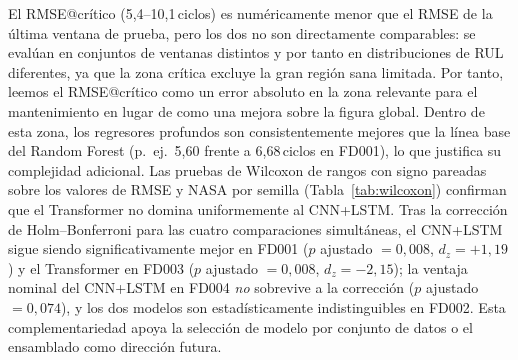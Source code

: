 \documentclass[5p,times,authoryear]{elsarticle}
\begin{document}
El RMSE@crítico (5{,}4--10{,}1\,ciclos) es numéricamente menor que el RMSE de la última ventana de prueba, pero los dos no son directamente comparables: se evalúan en conjuntos de ventanas distintos y por tanto en distribuciones de RUL diferentes, ya que la zona crítica excluye la gran región sana limitada. Por tanto, leemos el RMSE@crítico como un error absoluto en la zona relevante para el mantenimiento en lugar de como una mejora sobre la figura global. Dentro de esta zona, los regresores profundos son consistentemente mejores que la línea base del Random Forest (p.~ej.\ 5{,}60 frente a 6{,}68\,ciclos en FD001), lo que justifica su complejidad adicional. Las pruebas de Wilcoxon de rangos con signo pareadas sobre los valores de RMSE y NASA por semilla (Tabla~\ref{tab:wilcoxon}) confirman que el Transformer no domina uniformemente al CNN+LSTM. Tras la corrección de Holm--Bonferroni para las cuatro comparaciones simultáneas, el CNN+LSTM sigue siendo significativamente mejor en FD001 ($p$ ajustado $=0{,}008$, $d_z{=}+1{,}19$) y el Transformer en FD003 ($p$ ajustado $=0{,}008$, $d_z{=}-2{,}15$); la ventaja nominal del CNN+LSTM en FD004 \emph{no} sobrevive a la corrección ($p$ ajustado $=0{,}074$), y los dos modelos son estadísticamente indistinguibles en FD002. Esta complementariedad apoya la selección de modelo por conjunto de datos o el ensamblado como dirección futura.

\begin{table}[!t]
\centering
\caption{Prueba de Wilcoxon de rangos con signo pareada (bilateral) sobre RMSE por semilla, $N_{\mathrm{semillas}}{=}10$. $\Delta$RMSE y $d_z$ se definen ambos como Transformer menos CNN+LSTM, por lo que un valor \emph{positivo} favorece al CNN+LSTM (menor RMSE). $p_{\mathrm{Holm}}$ es el $p$-valor ajustado por Holm--Bonferroni sobre los cuatro conjuntos de datos; la significación usa $p_{\mathrm{Holm}}$.}
\label{tab:wilcoxon}
\small
{}
\end{table}
\end{document}
